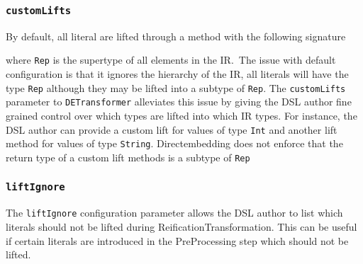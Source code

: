 \subsubsection{\texttt{customLifts}} %
\label{sub:customLifts}
By default, all literal are lifted through a method with the following signature

where \texttt{Rep} is the supertype of all elements in the IR.\
The issue with default configuration is that it ignores the hierarchy of the IR, all literals will have the type \texttt{Rep} although they may be lifted into a subtype of \texttt{Rep}.
The \texttt{customLifts} parameter to \texttt{DETransformer} alleviates this issue by giving the DSL author fine grained control over which types are lifted into which IR types.
For instance, the DSL author can provide a custom lift for values of type \texttt{Int} and another lift method for values of type \texttt{String}.
Directembedding does not enforce that the return type of a custom lift methods is a subtype of \texttt{Rep}

\subsubsection{\texttt{liftIgnore}} %
\label{sub:liftIgnore}
The \texttt{liftIgnore} configuration parameter allows the DSL author to list which literals should not be lifted during ReificationTransformation.
This can be useful if certain literals are introduced in the PreProcessing step which should not be lifted.



